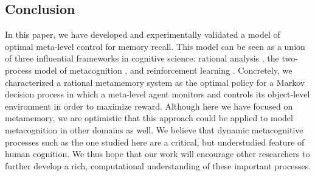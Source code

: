 

\subsection{Conclusion}

In this paper, we have developed and experimentally validated a model of optimal meta-level control for memory recall. This model can be seen as a union of three influential frameworks in cognitive science: rational analysis \citep{anderson1990adaptive}, the two-process model of metacognition \citepnelson{}, and reinforcement learning \citep{dayan2008decision}. Concretely, we characterized a rational metamemory system as the optimal policy for a Markov decision process in which a meta-level agent monitors and controls its object-level environment in order to maximize reward. Although here we have focused on metamemory, we are optimistic that this approach could be applied to model metacognition in other domains as well. We believe that dynamic metacognitive processes such as the one studied here are a critical, but understudied feature of human cognition. We thus hope that our work will encourage other researchers to further develop a rich, computational understanding of these important processes.

